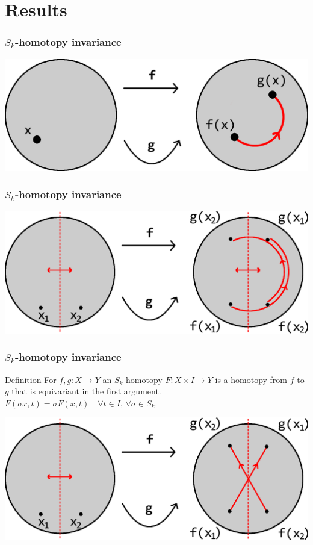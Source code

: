 \documentclass{beamer}[10pt]
\theoremstyle{definition}
\begin{document}
\section{Results}

\begin{frame}
\frametitle{$S_k$-homotopy invariance}
\centering
\includegraphics[scale=0.15]{prism.png}
\end{frame}

\begin{frame}
\frametitle{$S_k$-homotopy invariance}
\centering
\includegraphics[scale=0.15]{nonequivariantPrism.png}
\end{frame}

\begin{frame}
\frametitle{$S_k$-homotopy invariance}
\begin{block}{Definition}
For $f,g\colon X\to Y$ an $S_k$-homotopy $F\colon X\times I\longrightarrow Y$ is a homotopy from $f$ to $g$ that is equivariant in the first argument.\\
$F(\sigma x,t)=\sigma F(x,t)\quad \forall t\in I,\,\forall\sigma\in S_k$.
\end{block}
\centering
\includegraphics[scale=0.15]{equivariantPrism.png}
\end{frame}
\end{document}
